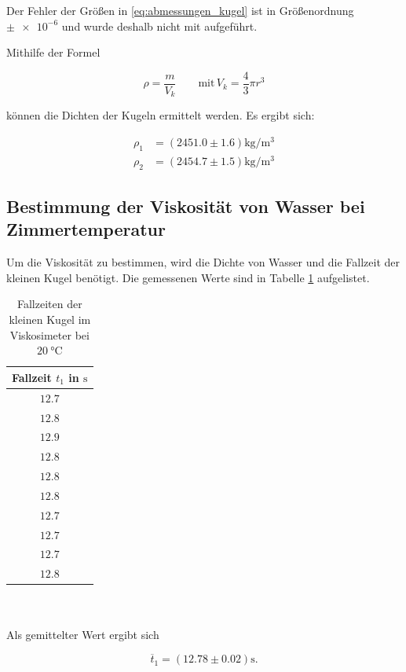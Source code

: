 Der Fehler der Größen in \eqref{eq:abmessungen_kugel} ist in Größenordnung $\pm \num{e-6}$
und wurde deshalb nicht mit aufgeführt.

Mithilfe der Formel%

\begin{equation*}
\rho=\frac{m}{V_{k}} \qquad \text{mit} \, V_{k}=\frac{4}{3}\pi r^3
\end{equation*}

können die Dichten der Kugeln ermittelt werden.
Es ergibt sich:

\begin{align*}
\rho_{1}&=\left(\num{2451.0}\pm\num{1.6}\right) \si{\kilogram\per\cubic\meter}\\
\rho_{2}&=\left(\num{2454.7}\pm\num{1.5}\right) \si{\kilogram\per\cubic\meter}
\end{align*}

\subsection{Bestimmung der Viskosität von Wasser bei Zimmertemperatur} \label{sec:visko}
Um die Viskosität zu bestimmen, wird die Dichte von Wasser und die Fallzeit der kleinen Kugel benötigt.
Die gemessenen Werte sind in Tabelle \ref{tab:messwerte_fallzeit_kugel_klein} aufgelistet. %
\begin{table}
\centering
\begin{tabular} {c}
	\toprule
  Fallzeit $t_1$ in $\si{\second}$ \\
  \midrule
  $\num{12.7}$ \\
  $\num{12.8}$ \\
  $\num{12.9}$ \\
  $\num{12.8}$ \\
  $\num{12.8}$ \\
  $\num{12.8}$ \\
  $\num{12.7}$ \\
  $\num{12.7}$ \\
  $\num{12.7}$ \\
  $\num{12.8}$ \\
\bottomrule
\end{tabular}
\caption{Fallzeiten der kleinen Kugel im Viskosimeter bei $\SI{20}{\degreeCelsius}$}
\label{tab:messwerte_fallzeit_kugel_klein}
\end{table}
\\
\\
\hfill
Als gemittelter Wert ergibt sich

\begin{equation}
\label{eq:gemittelte_fallzeit_klein}
\overline{t}_{1}=\left(\num{12.78}\pm\num{0.02}\right) \si{\second}.
\end{equation}

